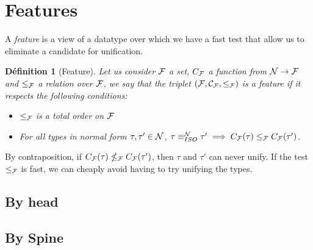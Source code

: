 \documentclass [a4paper,11pt]{scrartcl}
\newtheorem{definition}{Définition}[subsection]
\newcommand{\N}{{\cal N}}
\begin{document}
\section{Features}

\newcommand\F{\cal F}

A \emph{feature} is a view of a datatype over which we have a fast test
that allow us to eliminate a candidate for unification.

\begin{definition}[Feature]
Let us consider $\F$ a set, $C_{\F}$ a function from $\N \to \F$ and $\leq_{\F}$ a relation over $\F$, we say that the triplet $(\F,C_{\F},\leq_{\F})$ is a \emph{feature} if it respects the following conditions:
\begin{itemize}
\item $\leq_{\F}$ is a total order on $\F$
\item For all types in normal form $\tau,\tau'\in\N$, $\tau \unifN \tau' \implies C_{\F}(\tau) \leq_{\F} C_{\F}(\tau')$.
\end{itemize}
\end{definition}

By contraposition, if $C_{\F}(\tau) \nleq_{\F} C_{\F}(\tau')$, then
$\tau$ and $\tau'$ can never unify. If the test $\leq_{\F}$ is fast, we can cheaply
avoid having to try unifying the types.

\subsection{By head}


\subsection{By Spine}
\end{document}
